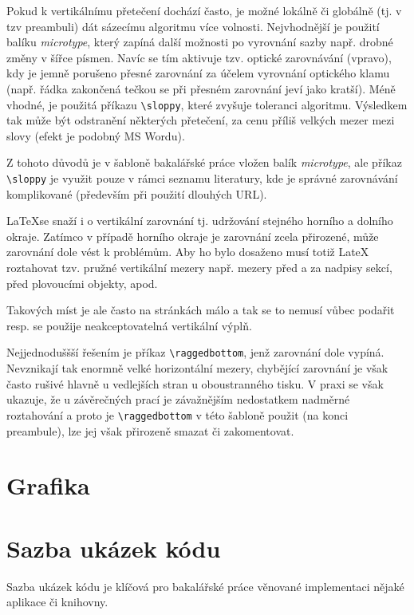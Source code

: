 \documentclass[male,czech,api_bc]{kitheses}
\begin{document}
Pokud k vertikálnímu přetečení dochází často, je možné lokálně či globálně (tj. v tzv preambuli) dát sázecímu algoritmu více volnosti. Nejvhodnější je použití balíku \textit{microtype}, který zapíná další možnosti po vyrovnání sazby např. drobné změny v šířce písmen. Navíc se tím aktivuje tzv. optické zarovnávání (vpravo), kdy je jemně porušeno přesné zarovnání za účelem vyrovnání optického klamu (např. řádka zakončená tečkou se při přesném zarovnání jeví jako kratší). Méně vhodné, je použitá příkazu \verb!\sloppy!, které zvyšuje toleranci algoritmu. Výsledkem tak může být odstranění některých přetečení, za cenu příliš velkých mezer mezi slovy (efekt je podobný MS Wordu).

Z tohoto důvodů je v šabloně bakalářské práce vložen balík  \textit{microtype}, ale příkaz \verb!\sloppy! je využit pouze v rámci seznamu literatury, kde je správné zarovnávání komplikované (především při použití dlouhých URL).

\LaTeX se snaží i o vertikální zarovnání tj. udržování stejného horního a dolního okraje. Zatímco v případě horního okraje je zarovnání zcela přirozené, může zarovnání dole vést k problémům. Aby ho bylo dosaženo musí totiž LateX roztahovat tzv. pružné vertikální mezery např. mezery před a za nadpisy sekcí, před plovoucími objekty, apod.

Takových míst je ale často na stránkách málo a tak se to nemusí vůbec podařit resp. se použije neakceptovatelná vertikální výplň. 

Nejjednoduššší řešením je příkaz \verb!\raggedbottom!, jenž zarovnání dole vypíná. Nevznikají tak enormně velké horizontální mezery, chybějící zarovnání je však často rušivé hlavně u vedlejších
stran u oboustranného tisku. V praxi se však ukazuje, že u závěrečných prací  je závažnějším nedostatkem nadměrné roztahování a proto je \verb!\raggedbottom! v této šabloně použit (na konci preambule), lze jej však přirozeně smazat či zakomentovat.


\chapter{Grafika}

\chapter{Sazba ukázek kódu}

Sazba ukázek kódu je klíčová pro bakalářské práce věnované implementaci nějaké aplikace či knihovny.
\end{document}
